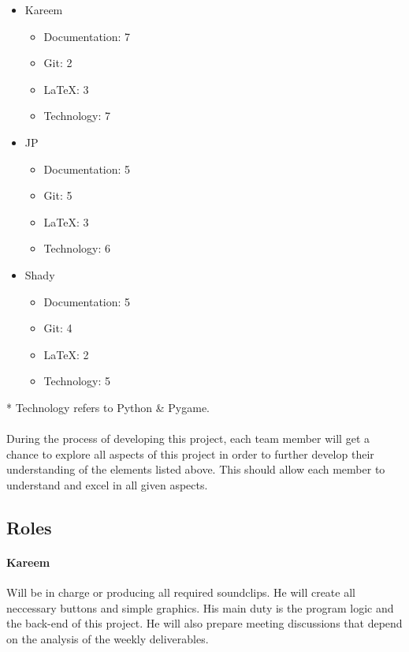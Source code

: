 \documentclass{article}
\begin{document}
\begin{itemize}
\item Kareem
\begin{itemize}
\item Documentation: 7
\item Git: 2
\item LaTeX: 3
\item Technology: 7
\end{itemize}

\item  JP
\begin{itemize}
\item Documentation: 5 
\item Git: 5 
\item LaTeX: 3 
\item Technology: 6
\end{itemize}

\item Shady
\begin{itemize}
\item Documentation: 5 
\item Git: 4 
\item LaTeX: 2 
\item Technology: 5
\end{itemize}
\end{itemize}

* Technology refers to Python \& Pygame.\\
\\
\indent During the process of developing this project, each team member will get a chance to explore all aspects of this project in order to further develop their understanding of the elements listed above. This should allow each member to understand and excel in all given aspects. 


\subsection{Roles}

\paragraph{Kareem\\}

Will be in charge or producing all required soundclips. He will create all neccessary buttons and simple graphics.
His main duty is the program logic and the back-end of this project. He will also prepare meeting discussions that depend on the analysis of the weekly deliverables.
\end{document}
